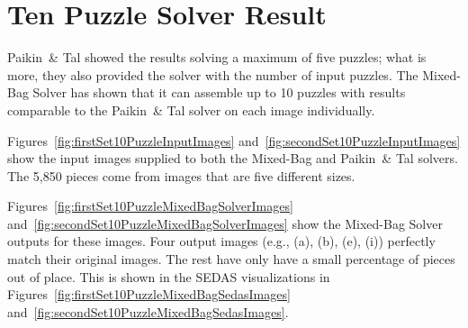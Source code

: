 \chapter{Ten Puzzle Solver Result}\label{chap:tenPuzzleSolving}

Paikin~\& Tal \cite{paikin2015} showed the results solving a maximum of five puzzles; what is more, they also provided the solver with the number of input puzzles.  The Mixed-Bag Solver has shown that it can assemble up to 10 puzzles with results comparable to the Paikin~\& Tal solver on each image individually.

Figures~\ref{fig:firstSet10PuzzleInputImages} and~\ref{fig:secondSet10PuzzleInputImages} show the input images supplied to both the Mixed-Bag and Paikin~\& Tal solvers. The 5,850 pieces come from images that are five different sizes.

Figures~\ref{fig:firstSet10PuzzleMixedBagSolverImages} and~\ref{fig:secondSet10PuzzleMixedBagSolverImages} show the Mixed-Bag Solver outputs for these images.  Four output images (e.g., (a), (b), (e), (i)) perfectly match their original images.  The rest have only have a small percentage of pieces out of place.  This is shown in the SEDAS visualizations in Figures~\ref{fig:firstSet10PuzzleMixedBagSedasImages} and~\ref{fig:secondSet10PuzzleMixedBagSedasImages}.

